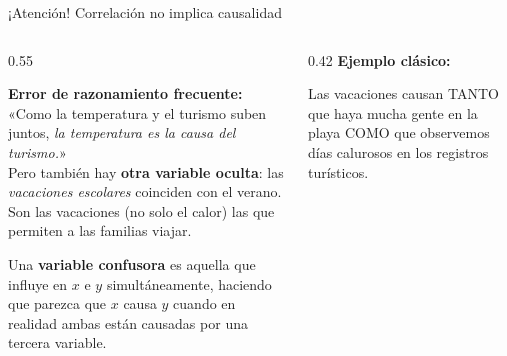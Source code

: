 \documentclass[aspectratio=169, 10pt, spanish]{beamer}
\begin{document}

\begin{frame}{¡Atención! Correlación no implica causalidad}
  \begin{columns}[T]
    \begin{column}{0.55\textwidth}
      \begin{errorbox}
        \textbf{Error de razonamiento frecuente:}\\[4pt]
        «Como la temperatura y el turismo suben juntos,
        \textit{la temperatura es la causa del turismo.}»\\[6pt]
        Pero también hay \textbf{otra variable oculta}:
        las \textit{vacaciones escolares} coinciden con
        el verano. Son las vacaciones (no solo el calor)
        las que permiten a las familias viajar.
      \end{errorbox}
      \vspace{6pt}
      \begin{notabox}
        \AlmFontFootnote
        Una \textbf{variable confusora} es aquella que
        influye en $x$ e $y$ simultáneamente, haciendo
        que parezca que $x$ causa $y$ cuando en realidad
        ambas están causadas por una tercera variable.
      \end{notabox}
    \end{column}
    \begin{column}{0.42\textwidth}
      \textbf{Ejemplo clásico:}\\[6pt]
      \begin{center}
      \end{center}
      \vspace{4pt}
      \AlmFontFootnote\color{AlmGris}
      Las vacaciones causan TANTO que haya mucha gente
      en la playa COMO que observemos días calurosos
      en los registros turísticos.
    \end{column}
  \end{columns}
\end{frame}
\end{document}
